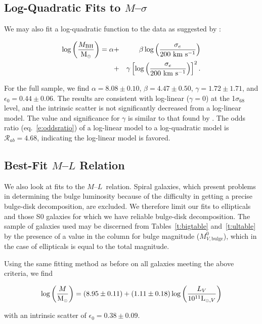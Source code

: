 \documentclass[twosided,letterpaper,numberedappendix]{emulateapj}
\newcommand{\beq}{
\begin{equation}
}
\newcommand{\eeq}{
\end{equation}
}
\newcommand{\beqa}{
\begin{eqnarray}
}
\newcommand{\eeqa}{
\end{eqnarray}
}
\newcommand{\msun}     {\ensuremath{{\rm M}_{\scriptscriptstyle \odot}}}
\newcommand{\kms}      {\ensuremath{~\mathrm{km~s^{-1}}}}
\newcommand{\ml}       {\ensuremath{M}{--}\ensuremath{L}}
\newcommand{\mbh}      {\ensuremath{M_{\mathrm{BH}}}}
\newcommand{\sigmaconf}   {\ensuremath{\sigma_{68}}}
\newcommand{\mlinterr} {\ensuremath{8.95 \pm 0.11}}
\newcommand{\mlslopeerr} {\ensuremath{1.11 \pm 0.18}}
\newcommand{\mlscaterr} {\ensuremath{0.38 \pm 0.09}}
\begin{document}
\subsection{Log-Quadratic Fits to \texorpdfstring{$M$--$\sigma$}{M-Sigma}}
\label{logquad}
We may also fit a log-quadratic function to the data as suggested by
\citet{wyithe06}:
%
\beqa
\log{\left(\frac{\mbh}{\msun}\right)}= \alpha &+& \beta 
\log{\left(\frac{\sigma_e}{200\kms}\right)}\nonumber\\ &+& 
\gamma \left[\log{\left(\frac{\sigma_e}{200\kms}\right)}\right]^2.
\label{e:logquad}
\eeqa
%
%
For the full sample, we find $\alpha = 8.08 \pm 0.10$, $\beta = 4.47
\pm 0.50$, $\gamma = 1.72 \pm 1.71$, and $\epsilon_0 = 0.44 \pm 0.06$.
The results are consistent with log-linear ($\gamma = 0$) at the
1$\sigmaconf$ level, and the intrinsic scatter is not significantly
decreased from a log-linear model.  The value and significance for
$\gamma$ is similar to that found by \citet{wyithe06erratum}.  The
odds ratio (eq.~\ref{e:oddsratio}) of a log-linear model to a
log-quadratic model is ${\mathcal R}_{ab} = 4.68$, indicating the
log-linear model is favored.

\subsection{Best-Fit \texorpdfstring{$M$--$L$}{M-L} Relation}
\label{mlresults}

We also look at fits to the \ml\ relation.  Spiral galaxies, which
present problems in determining the bulge luminosity because of the
difficulty in getting a precise bulge-disk decomposition, are
excluded.  We therefore limit our fits to ellipticals and those S0
galaxies for which we have reliable bulge-disk decomposition.  The
sample of galaxies used may be discerned from Tables~\ref{t:bigtable}
and~\ref{t:ultable} by the presence of a value in the column for bulge
magnitude ($M^{0}_{V,\mathrm{bulge}}$), which in the case of
ellipticals is equal to the total magnitude.

%
%
Using the same fitting method as before on all galaxies meeting the
above criteria, we find
%
\beq 
\log{\left(\frac{M}{\msun}\right)} = (\mlinterr) + (\mlslopeerr) 
\log{\left(\frac{L_V}{10^{11} {\rm L}_{{\scriptscriptstyle \odot}, 
V}}\right)}
\label{e:noulmlfit}
\eeq
%
with an intrinsic scatter of $\epsilon_0 = \mlscaterr$.
\end{document}
